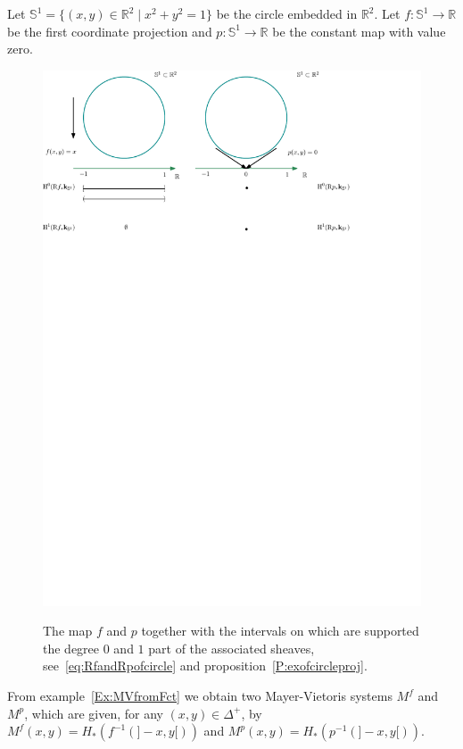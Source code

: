 \documentclass[a4paper, english, 11pt]{article}
\newcommand{\0}{\vec{0}}
\newcommand{\R}[0]{\mathbb{R}}
\begin{document}
Let $\mathbb{S}^1 = \{(x,y) \in \R^2 \mid x^2 + y^2 = 1 \}$ be the  circle embedded in $\R^2$. 
Let  $f : \mathbb{S}^1 \to \R$ be the first coordinate projection and $p : \mathbb{S}^1 \to \R $ 
be the constant map with value zero.
\begin{figure}
\begin{center}
\includegraphics[scale=0.8]{exemple.pdf}
\label{fig:circleprojection}
\caption{The map $f$ and $p$ together with the intervals on which are supported the degree $0$ and $1$ part of the associated sheaves, see~\eqref{eq:RfandRpofcircle} and proposition~\ref{P:exofcircleproj}.}
\end{center}
\end{figure}
From example~\ref{Ex:MVfromFct} we obtain two Mayer-Vietoris systems $M^f$ and $M^p$, which are given, for any $(x,y)\in \Delta^+$, by
$M^f(x,y)= H_*(f^{-1}(]-x,y[))$ and $M^p(x,y)= H_*(p^{-1}(]-x,y[))$. 
\end{document}
